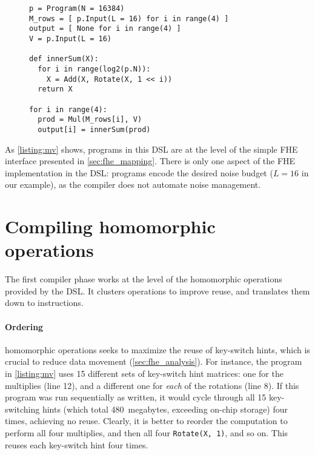 \begin{figure}
\begin{center}
  \begin{lstlisting}[caption={$(4 \times 16K)$ matrix-vector multiply in \name's DSL.}, mathescape=true, style=custompython, label=listing:mv]
p = Program(N = 16384)
M_rows = [ p.Input(L = 16) for i in range(4) ]
output = [ None for i in range(4) ]
V = p.Input(L = 16)

def innerSum(X):
  for i in range(log2(p.N)):
    X = Add(X, Rotate(X, 1 << i))
  return X

for i in range(4):
  prod = Mul(M_rows[i], V)
  output[i] = innerSum(prod)
  \end{lstlisting}
\end{center}
\end{figure}

As \autoref{listing:mv} shows, programs in this DSL are at the level
of the simple FHE interface presented in \autoref{sec:fhe_mapping}.
There is only one aspect of the FHE implementation in the DSL:
programs encode the desired noise budget ($L=16$ in our example),
as the compiler does not automate noise management.

\section{Compiling homomorphic operations}

The first compiler phase works at the level of the homomorphic operations
provided by the DSL. It clusters operations to improve reuse, and translates
them down to instructions.

\paragraph{Ordering} homomorphic operations seeks to maximize
the reuse of key-switch hints, which is crucial to reduce data movement (\autoref{sec:fhe_analysis}).
For instance, the program in  \autoref{listing:mv}
uses 15 different sets of key-switch hint matrices: one for the multiplies (line 12), 
and a different one for \emph{each} of the rotations (line 8).
If this program was run sequentially as written, it would cycle through all 15 key-switching hints
(which total 480\, megabytes, exceeding on-chip storage) four times, achieving no reuse.
Clearly, it is better to reorder the computation to perform all four multiplies, and then all four \texttt{Rotate(X, 1)}, and so on.
This reuses each key-switch hint four times.

